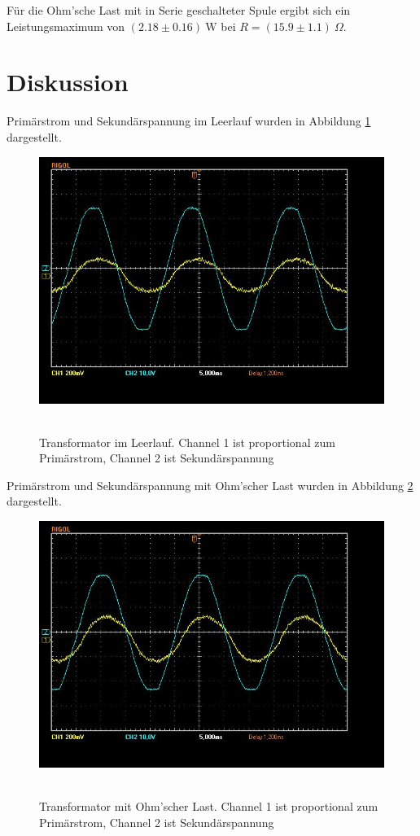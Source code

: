 \documentclass{article}
\newcommand{\W}{\text{W}}
\begin{document}
Für die Ohm'sche Last mit in Serie geschalteter Spule ergibt sich ein Leistungsmaximum von $(2.18 \pm 0.16)~\W$ bei $R=(15.9 \pm 1.1)~\Omega$.

\section{Diskussion}


Primärstrom und Sekundärspannung im Leerlauf wurden in Abbildung \ref{fig:task1} dargestellt.


\begin{figure}[H]
\caption{Transformator im Leerlauf. Channel 1 ist proportional zum Primärstrom, Channel 2 ist Sekundärspannung}
\label{fig:task1}
{\centering
\includegraphics[scale=0.4]{task1.jpg}
~
}
\end{figure}


Primärstrom und Sekundärspannung mit Ohm’scher Last wurden in Abbildung \ref{fig:task2} dargestellt.

\begin{figure}[H]
\caption{Transformator mit Ohm'scher Last. Channel 1 ist proportional zum Primärstrom, Channel 2 ist Sekundärspannung}
\label{fig:task2}
{\centering
\includegraphics[scale=0.4]{task2.jpg}
~
}
\end{figure}
\end{document}
